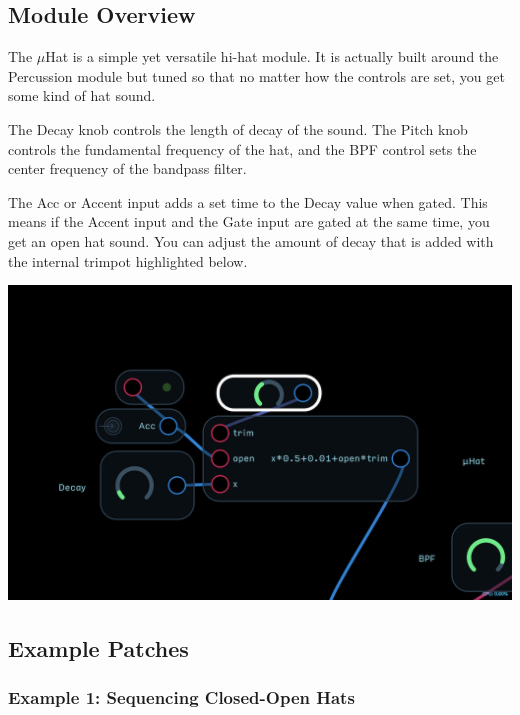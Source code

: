 \documentclass[11pt]{book}
\begin{document}
\begin{multicols*}{2}

\subsection*{Module Overview}

The $\mu$Hat is a simple yet versatile hi-hat module. It is actually built around the Percussion module but tuned so that no matter how the controls are set, you get some kind of hat sound.

The Decay knob controls the length of decay of the sound. The Pitch knob controls the fundamental frequency of the hat, and the BPF control sets the center frequency of the bandpass filter.

The Acc or Accent input adds a set time to the Decay value when gated. This means if the Accent input and the Gate input are gated at the same time, you get an open hat sound. You can adjust the amount of decay that is added with the internal trimpot highlighted below.

\begin{center}
\includegraphics[width=0.95\linewidth]{uhat-fig1.png}
\end{center}

\subsection*{Example Patches}

\subsubsection*{Example 1: Sequencing Closed-Open Hats}


\end{multicols*}
\end{document}
